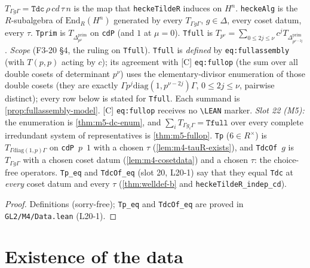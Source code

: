 \begin{definition}\label{def:m4-hecke}
  \leanok
  $T_{\Gamma g\Gamma}=\texttt{Tdc}\,\rho\,cd\,\tau\,n$ is the map that \texttt{heckeTildeR} induces on $H^n$. \texttt{heckeAlg} is the
  $R$-subalgebra of $\mathrm{End}_R(H^n)$ generated by every $T_{\Gamma g\Gamma}$, $g\in\Delta$, every coset datum, every $\tau$.
  \texttt{Tprim} is $T_{\Delta^{\mathrm{prim}}_{p^\mu}}$ on \texttt{cdP} (and $1$ at $\mu=0$). \texttt{Tfull} is
  $T_{p^\nu}=\sum_{0\le2j\le\nu}c^jT_{\Delta^{\mathrm{prim}}_{p^{\nu-2j}}}$.
  \emph{Scope} (F3-20 \S4, the ruling on \texttt{Tfull}). \texttt{Tfull} is \emph{defined} by \texttt{eq:fullassembly} (with
  $T(p,p)$ acting by $c$); its agreement with [C] \texttt{eq:fullop} (the sum over all double cosets of determinant $p^\nu$) uses
  the elementary-divisor enumeration of those double cosets (they are exactly $\Gamma p^j\mathrm{diag}(1,p^{\nu-2j})\Gamma$,
  $0\le2j\le\nu$, pairwise distinct); every row below is stated for \texttt{Tfull}. Each summand is
  \ref{prop:fullassembly-model}. [C] \texttt{eq:fullop} receives no \texttt{\textbackslash LEAN} marker. \emph{Slot 22 (M5):} the
  enumeration is \ref{thm:m5-dc-enum}, and $\sum_iT_{\Gamma g_i\Gamma}=\texttt{Tfull}$ over every complete irredundant system of
  representatives is \ref{thm:m5-fullop}.
  \texttt{Tp} ($6\in R^\times$) is $T_{\Gamma\mathrm{diag}(1,p)\Gamma}$ on \texttt{cdP}~$p$~$1$ with a chosen $\tau$
  (\ref{lem:m4-tauR-exists}), and \texttt{TdcOf}~$g$ is $T_{\Gamma g\Gamma}$ with a chosen coset datum (\ref{lem:m4-cosetdata}) and a
  chosen $\tau$: the choice-free operators. \texttt{Tp\_eq} and \texttt{TdcOf\_eq} (slot 20, L20-1) say that they equal
  \texttt{Tdc} at \emph{every} coset datum and every $\tau$ (\ref{thm:welldef-b} and \texttt{heckeTildeR\_indep\_cd}).
\end{definition}
\begin{proof}
  \leanok
  Definitions (sorry-free); \texttt{Tp\_eq} and \texttt{TdcOf\_eq} are proved in \texttt{GL2/M4/Data.lean} (L20-1).
\end{proof}

\section{Existence of the data}

